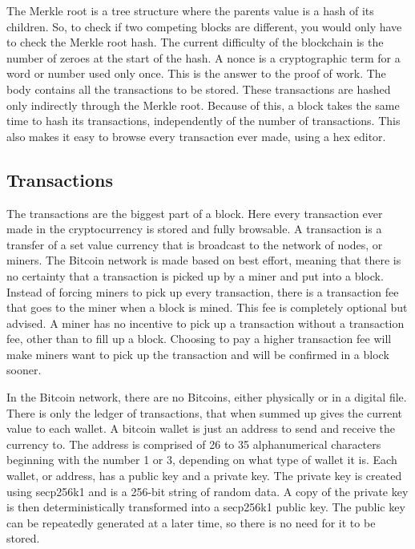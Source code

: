 \documentclass[11pt]{article}
\begin{document}
The Merkle root\cite{merkle} is a tree structure where the parents value is a hash of its children. So, to check if two competing blocks are different, you would only have to check the Merkle root hash. The current difficulty of the blockchain is the number of zeroes at the start of the hash. A nonce is a cryptographic term for a word or number used only once. This is the answer to the proof of work. The body contains all the transactions to be stored. These transactions are hashed only indirectly through the Merkle root. Because of this, a block takes the same time to hash its transactions, independently of the number of transactions. This also makes it easy to browse every transaction ever made, using a hex editor.
 


\subsection{Transactions}

The transactions are the biggest part of a block. Here every transaction ever made in the cryptocurrency is stored and fully browsable. A transaction is a transfer of a set value currency that is broadcast to the network of nodes, or miners. The Bitcoin network is made based on best effort, meaning that there is no certainty that a transaction is picked up by a miner and put into a block. Instead of forcing miners to pick up every transaction, there is a transaction fee that goes to the miner when a block is mined. This fee is completely optional but advised. A miner has no incentive to pick up a transaction without a transaction fee, other than to fill up a block. Choosing to pay a higher transaction fee will make miners want to pick up the transaction and will be confirmed in a block sooner. 

In the Bitcoin network, there are no Bitcoins, either physically or in a digital file. There is only the ledger of transactions, that when summed up gives the current value to each wallet. A bitcoin wallet is just an address to send and receive the currency to. The address is comprised of 26 to 35 alphanumerical characters beginning with the number 1 or 3, depending on what type of wallet it is. Each wallet, or address, has a public key and a private key. The private key is created using secp256k1\cite{sigalg} and is a 256-bit string of random data. A copy of the private key is then deterministically transformed into a secp256k1 public key. The public key can be repeatedly generated at a later time, so there is no need for it to be stored. 
\end{document}
